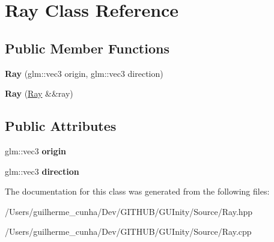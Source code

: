 \hypertarget{class_ray}{}\section{Ray Class Reference}
\label{class_ray}
\subsection*{Public Member Functions}
\begin{DoxyCompactItemize}
\item 
\hypertarget{class_ray_a49a2693e5f37e655a20ffcff69bb0b55}{}{\bfseries Ray} (glm\+::vec3 origin, glm\+::vec3 direction)\label{class_ray_a49a2693e5f37e655a20ffcff69bb0b55}

\item 
\hypertarget{class_ray_a09c2aa04dfe2732dc81ef09a39729b88}{}{\bfseries Ray} (\hyperlink{class_ray}{Ray} \&\&ray)\label{class_ray_a09c2aa04dfe2732dc81ef09a39729b88}

\end{DoxyCompactItemize}
\subsection*{Public Attributes}
\begin{DoxyCompactItemize}
\item 
\hypertarget{class_ray_af86f612d19416f116ad658c8f1a11e43}{}glm\+::vec3 {\bfseries origin}\label{class_ray_af86f612d19416f116ad658c8f1a11e43}

\item 
\hypertarget{class_ray_a6c8212513588a8f3a63b55eaf4e63c17}{}glm\+::vec3 {\bfseries direction}\label{class_ray_a6c8212513588a8f3a63b55eaf4e63c17}

\end{DoxyCompactItemize}


The documentation for this class was generated from the following files\+:\begin{DoxyCompactItemize}
\item 
/\+Users/guilherme\+\_\+cunha/\+Dev/\+G\+I\+T\+H\+U\+B/\+G\+U\+Inity/\+Source/Ray.\+hpp\item 
/\+Users/guilherme\+\_\+cunha/\+Dev/\+G\+I\+T\+H\+U\+B/\+G\+U\+Inity/\+Source/Ray.\+cpp\end{DoxyCompactItemize}
